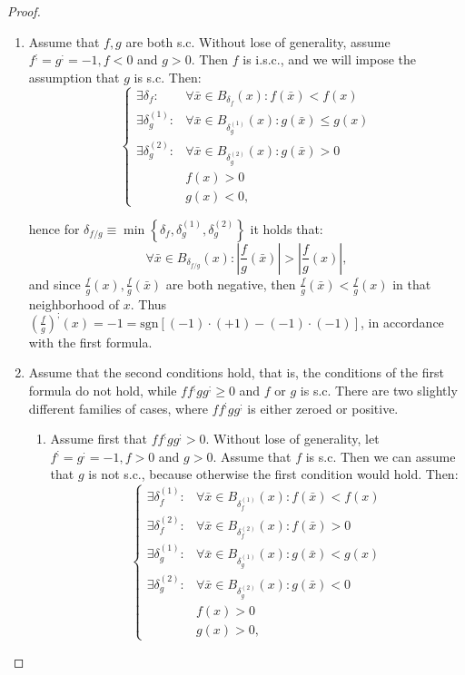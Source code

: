 \documentclass[11pt]{book}
\begin{document}
\begin{proof}
\begin{enumerate}
\item Assume that $f,g$ are both s.c. Without lose of generality, assume $f^{;}=g^{;}=-1,f<0$ and $g>0$. Then $f$ is i.s.c., and we will impose the assumption that $g$ is s.c. Then:
$$\begin{cases}\exists\delta_{f}: & \forall\bar{x}\in B_{\delta_{f}}\left(x\right):f\left(\bar{x}\right)< f\left(x\right)\\ \exists\delta_{g}^{\left(1\right)}: & \forall\bar{x}\in B_{\delta_{g}^{\left(1\right)}}\left(x\right):g\left(\bar{x}\right)\leq g\left(x\right)\\ \exists\delta_{g}^{\left(2\right)}: & \forall\bar{x}\in B_{\delta_{g}^{\left(2\right)}}\left(x\right):g\left(\bar{x}\right)>0\\& f\left(x\right)>0\\& g\left(x\right)<0, \end{cases}$$

hence for $\delta_{f/g}\equiv\min\left\{ \delta_{f},\delta_{g}^{\left(1\right)},\delta_{g}^{\left(2\right)}\right\}$ it holds that: $$\forall\bar{x}\in B_{\delta_{f/g}}\left(x\right):\left|\frac{f}{g}\left(\bar{x}\right)\right|>\left|\frac{f}{g}\left(x\right)\right|,$$
and since $\frac{f}{g}\left(x\right),\frac{f}{g}\left(\bar{x}\right)$ are both negative, then $\frac{f}{g}\left(\bar{x}\right)<\frac{f}{g}\left(x\right)$ in that neighborhood of $x$. Thus $\left(\frac{f}{g}\right)^{;}\left(x\right)=-1=\text{sgn}\left[\left(-1\right)\cdot\left(+1\right)-\left(-1\right)\cdot\left(-1\right)\right]$, in accordance with the first formula.

\item Assume that the second conditions hold, that is, the conditions of the first formula do not hold, while $ff^{;}gg^{;}\geq0$ and $f$ or $g$ is s.c. There are two slightly different families of cases, where $ff^{;}gg^{;}$ is either zeroed or positive.

\begin{enumerate}
\item Assume first that $ff^{;}gg^{;}>0$. Without lose of generality, let $f^{;}=g^{;}=-1,f>0$ and $g>0$. Assume that $f$ is s.c. Then we can assume that $g$ is not s.c., because otherwise the first condition would hold. Then:
$$\begin{cases}\exists\delta_{f}^{\left(1\right)}: & \forall\bar{x}\in B_{\delta_{f}^{\left(1\right)}}\left(x\right):f\left(\bar{x}\right)< f\left(x\right)\\ \exists\delta_{f}^{\left(2\right)}: & \forall\bar{x}\in B_{\delta_{f}^{\left(2\right)}}\left(x\right):f\left(\bar{x}\right)>0\\\exists\delta_{g}^{\left(1\right)}: & \forall\bar{x}\in B_{\delta_{g}^{\left(1\right)}}\left(x\right):g\left(\bar{x}\right)< g\left(x\right)\\\exists\delta_{g}^{\left(2\right)}: & \forall\bar{x}\in B_{\delta_{g}^{\left(2\right)}}\left(x\right):g\left(\bar{x}\right)<0\\ & f\left(x\right)>0\\& g\left(x\right)>0,\end{cases}$$


\end{enumerate}
\end{enumerate}
\end{proof}
\end{document}
